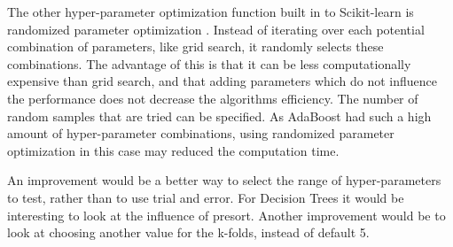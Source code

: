 \documentclass{article}
\begin{document}
	The other hyper-parameter optimization function built in to  Scikit-learn is randomized parameter optimization \cite{gridsearch}. Instead of iterating over each potential combination of parameters, like grid search, it randomly selects these combinations. The advantage of this is that it can be less computationally expensive than grid search, and that adding parameters which do not influence the performance does not decrease the algorithms efficiency. The number of random samples that are tried can be specified.  As AdaBoost had such a high amount of hyper-parameter combinations, using randomized parameter optimization in this case may reduced the computation time. 

	An improvement would be a better way to select the range of hyper-parameters to test, rather than to use trial and error.
	For Decision Trees it would be interesting to look at the influence of presort.
	Another improvement would be to look at choosing another value for the k-folds, instead of default 5. 



\end{document}
